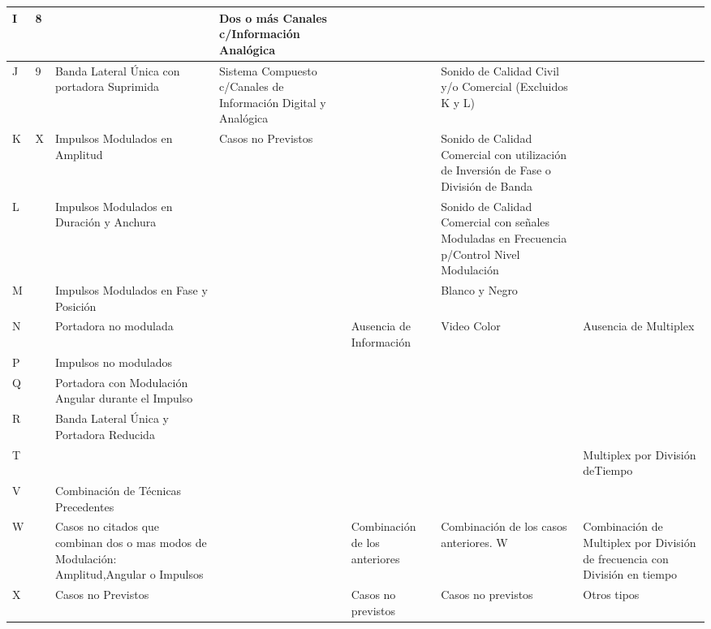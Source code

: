 \begin{longtable}{|p{0.8cm}|p{0.3cm}|p{2cm}|p{2cm}|p{2cm}|p{2cm}|p{2cm}|}
I & 8 &  & Dos o más Canales c/Información Analógica &  &  &  \\ \hline
J & 9 & Banda Lateral Única con  portadora Suprimida & Sistema Compuesto c/Canales de Información Digital y Analógica &  & Sonido de Calidad Civil y/o Comercial (Excluidos  K y L)& \\ \hline
K & X & Impulsos Modulados en Amplitud & Casos no Previstos &  & Sonido de Calidad Comercial con utilización de Inversión de Fase o División de Banda &  \\ \hline
L &  & Impulsos Modulados en Duración y Anchura &  &  & Sonido de Calidad Comercial con señales Moduladas en Frecuencia p/Control Nivel Modulación &  \\ \hline
M &  & Impulsos Modulados en Fase y Posición &  &  & Blanco y Negro &  \\ \hline
N &  & Portadora no modulada &  & Ausencia de Información & Video Color & Ausencia de Multiplex \\ \hline
P &  & Impulsos no modulados &  &  &  &  \\ \hline
Q &  & Portadora con Modulación Angular durante el Impulso &  &  &  &  \\ \hline
R &  & Banda Lateral Única y Portadora Reducida &  &  &  &  \\ \hline
T &  &  &  &  &  & Multiplex por División deTiempo \\ \hline
V &  & Combinación de Técnicas Precedentes &  &  &  &  \\ \hline
W &  & Casos no citados que combinan dos o mas modos de Modulación: Amplitud,Angular o Impulsos &  & Combinación de los anteriores & Combinación de los casos anteriores. 
W & Combinación de Multiplex por División de frecuencia con División en tiempo \\ \hline
X &  & Casos no Previstos &  & Casos no previstos & Casos no previstos & Otros tipos \\ \hline

\end{longtable}

